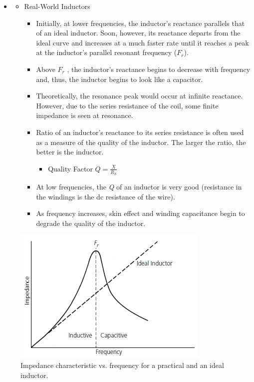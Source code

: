 \begin{itemize}
	\item[] 
	\begin{itemize}
		\item Real-World Inductors
		\begin{itemize}
			\item Initially, at lower frequencies, the inductor's reactance
			parallels that of an ideal inductor. Soon, however, its reactance
			departs from the ideal curve and increases at a much faster
			rate until it reaches a peak at the inductor's parallel resonant
			frequency ($F_r$). 
			\item Above $F_r$ , the inductor’s reactance begins to decrease with frequency and, thus, the inductor begins to look like a capacitor. 
			\item Theoretically, the resonance peak would occur at
			infinite reactance. However, due to the series resistance of the coil, some finite impedance is seen at resonance.
			\item Ratio of an inductor's reactance to its series resistance is
			often used as a measure of the quality of the inductor. The larger
			the ratio, the better is the inductor. 
			\begin{itemize}
				\item Quality Factor $Q = \frac{X}{R_S}$
			\end{itemize}
			\item At low frequencies, the \textit{Q} of an inductor is very good (resistance in the windings is the dc resistance of the
			wire).
			\item As frequency increases, skin effect and winding capacitance begin to degrade the quality of	the inductor.
		\end{itemize}
	\end{itemize}
\end{itemize}


\begin{figure} [H]
	\centering
	\includegraphics[width=0.6\linewidth]{graphics/19.png}
	\caption{Impedance characteristic vs. frequency for a practical and an
		ideal inductor.}
	\label{fig:19}
\end{figure}

